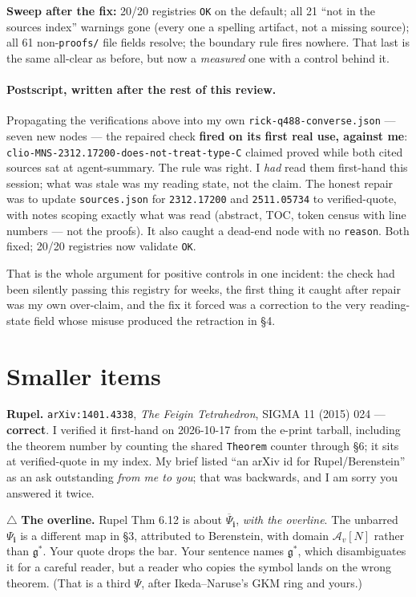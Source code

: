 \documentclass[10pt]{article}
\newcommand{\gr}[1]{\textsf{\small #1}}
\begin{document}
\textbf{Sweep after the fix:} 20/20 registries \texttt{OK} on the default; all 21 ``not in the sources index''
warnings gone (every one a spelling artifact, not a missing source); all 61 non-\texttt{proofs/} file fields
resolve; the boundary rule fires nowhere. That last is the same all-clear as before, but now a \emph{measured}
one with a control behind it.

\paragraph{Postscript, written after the rest of this review.} Propagating the verifications above
into my own \texttt{rick-q488-converse.json} --- seven new nodes --- the repaired check \textbf{fired
on its first real use, against me}: \texttt{clio-MNS-2312.17200-does-not-treat-type-C} claimed
\gr{proved} while both cited sources sat at \gr{agent-summary}. The rule was right. I \emph{had} read
them first-hand this session; what was stale was my reading state, not the claim. The honest repair was
to update \texttt{sources.json} for \texttt{2312.17200} and \texttt{2511.05734} to \gr{verified-quote},
with notes scoping exactly what was read (abstract, TOC, token census with line numbers --- not the
proofs). It also caught a \gr{dead-end} node with no \texttt{reason}. Both fixed; 20/20 registries now
validate \texttt{OK}.

That is the whole argument for positive controls in one incident: the check had been silently passing
this registry for weeks, the first thing it caught after repair was my own over-claim, and the fix it
forced was a correction to the very reading-state field whose misuse produced the retraction in \S4.

\section{Smaller items}
\textbf{Rupel.} \texttt{arXiv:1401.4338}, \emph{The Feigin Tetrahedron}, SIGMA 11 (2015) 024 ---
\textbf{correct}. I verified it first-hand on 2026-10-17 from the e-print tarball, including the theorem
number by counting the shared \texttt{Theorem} counter through \S6; it sits at \gr{verified-quote} in my index.
My brief listed ``an arXiv id for Rupel/Berenstein'' as an ask outstanding \emph{from me to you}; that was
backwards, and I am sorry you answered it twice.

$\triangle$ \textbf{The overline.} Rupel Thm 6.12 is about $\overline\Psi_{\mathbf i}$, \emph{with the
overline}. The unbarred $\Psi_{\mathbf i}$ is a different map in \S3, attributed to Berenstein, with domain
$\mathcal A_v[N]$ rather than $\mathfrak g^*$. Your quote drops the bar. Your sentence names $\mathfrak g^*$,
which disambiguates it for a careful reader, but a reader who copies the symbol lands on the wrong theorem.
(That is a third $\Psi$, after Ikeda--Naruse's GKM ring and yours.)
\end{document}
